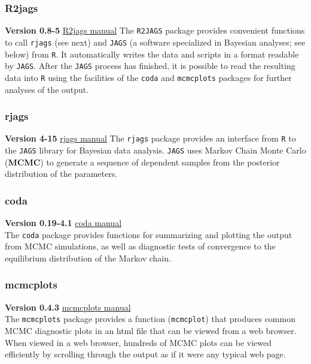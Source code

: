 \documentclass[
]{book}
\begin{document}
\subsubsection{R2jags}\label{r2jags}

\textbf{Version 0.8-5} \href{/https://cran.r-project.org/web/packages/R2jags/R2jags.pdf}{R2jags manual}
The \texttt{R2JAGS} package provides convenient functions to call \texttt{rjags} (see next) and \texttt{JAGS} (a software specialized in Bayesian analyses; see below) from \texttt{R}. It automatically writes the data and scripts in a format readable by \texttt{JAGS}. After the \texttt{JAGS} process has finished, it is possible to read the resulting data into \texttt{R} using the facilities of the \texttt{coda} and \texttt{mcmcplots} packages for further analyses of the output.

\subsubsection{rjags}\label{rjags}

\textbf{Version 4-15} \href{https:/cran.r-project.org/web/packages/rjags/rjags.pdf}{rjags manual}
The \texttt{rjags} package provides an interface from \texttt{R} to the \texttt{JAGS} library for Bayesian data analysis. \texttt{JAGS} uses Markov Chain Monte Carlo (\textbf{MCMC}) to generate a sequence of dependent samples from the posterior distribution of the parameters.

\subsubsection{coda}\label{coda}

\textbf{Version 0.19-4.1} \href{https://cran.r-project.org/web/packages/coda/coda.pdf}{coda manual}\\
The \texttt{coda} package provides functions for summarizing and plotting the output from MCMC simulations, as well as diagnostic tests of convergence to the equilibrium distribution of the Markov chain.

\subsubsection{mcmcplots}\label{mcmcplots}

\textbf{Version 0.4.3} \href{https://cran.r-project.org/web/packages/mcmcplots/mcmcplots.pdf}{mcmcplots manual}\\
The \texttt{mcmcplots} package provides a function (\texttt{mcmcplot}) that produces common MCMC diagnostic plots in an html file that can be viewed from a web browser. When viewed in a web browser, hundreds of MCMC plots can be viewed efficiently by scrolling through the output as if it were any typical web page.
\end{document}
